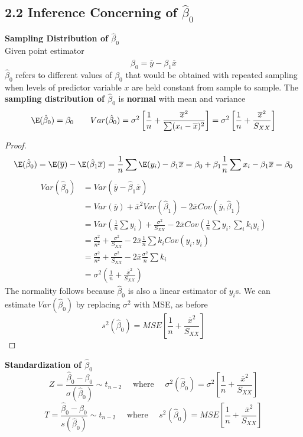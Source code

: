 \documentclass[11pt]{article}
\begin{document}
\subsection*{2.2 Inference Concerning of $\hat{\beta}_0$}

\begin{defn*}
	\textbf{Sampling Distribution of $\hat{\beta}_0$} \\
	Given point estimator 
	\[
		\hat{\beta}_0 = \overline{y} - \beta_1 \overline{x}
	\]
	$\hat{\beta}_0$ refers to different values of $\beta_0$ that would be obtained with repeated sampling when levels of predictor variable $x$ are held constant from sample to sample. The \textbf{sampling distribution of $\hat{\beta}_0$} is \textbf{normal} with mean and variance
	\[
		\E(\hat{\beta}_0) = \beta_0 \quad \quad Var(\hat{\beta}_0) = \sigma^2 \left[ \frac{1}{n} + \frac{\overline{x}^2}{\sum (x_i - \overline{x})^2} \right] = \sigma^2 \left[ \frac{1}{n} + \frac{\overline{x}^2}{S_{XX}} \right]
	\]
	\begin{proof}
		\[
			\E(\hat{\beta}_0) 
			= \E(\overline{y}) - \E(\hat{\beta}_1 \overline{x}) 
			= \frac{1}{n} \sum \E(y_i) - \beta_1 \overline{x}
			= \beta_0 + \beta_1 \frac{1}{n}\sum x_i - \beta_1 \overline{x} = \beta_0
		\]
		\begin{align*}
			Var(\hat{\beta}_0)
			&= Var(\overline{y} - \hat{\beta}_1 \overline{x})\\
			&= Var(\overline{y}) + \overline{x}^2 Var(\hat{\beta}_1) - 2\overline{x} Cov(\overline{y}, \hat{\beta}_1) \\
			&= Var(\frac{1}{n}\sum y_i) + \frac{\sigma^2}{S_{XX}} - 2\overline{x} Cov(\frac{1}{n} \sum y_i , \sum_i k_i y_i )\\
			&= \frac{\sigma^2}{n^2} + \frac{\sigma^2}{S_{XX}} - 2\overline{x} \frac{1}{n} \sum k_i Cov(y_i, y_i)\\
			&= \frac{\sigma^2}{n^2} + \frac{\sigma^2}{S_{XX}} - 2\overline{x} \frac{\sigma^2}{n} \sum k_i \\ 
			&= \sigma^2 \left(\frac{1}{n} + \frac{\overline{x}^2}{S_{XX}} \right)
		\end{align*}
		The normality follows because $\hat{\beta}_0$ is also a linear estimator of $y_i$s. We can estimate $Var(\hat{\beta}_0)$ by replacing $\sigma^2$ with MSE, as before
		\[
			s^2(\hat{\beta}_0) = MSE \left[ \frac{1}{n} + \frac{\overline{x}^2}{S_{XX}} \right]
		\] 
	\end{proof}
\end{defn*}

\begin{defn*}
	\textbf{Standardization of $\hat{\beta}_0$} \\
	
	\[
		Z = \frac{\hat{\beta}_0 - \beta_0}{\sigma(\hat{\beta}_0)} \sim t_{n-2} \quad \text{ where }\quad \sigma^2(\hat{\beta}_0) =  \sigma^2 \left[ \frac{1}{n} + \frac{\overline{x}^2}{S_{XX}} \right]
	\]
	\[
		T = \frac{\hat{\beta}_0 - \beta_0}{s(\hat{\beta}_0)} \sim t_{n-2} \quad \text{ where } \quad s^2(\hat{\beta}_0) = MSE \left[ \frac{1}{n} + \frac{\overline{x}^2}{S_{XX}} \right]
	\]
\end{defn*}
\end{document}
